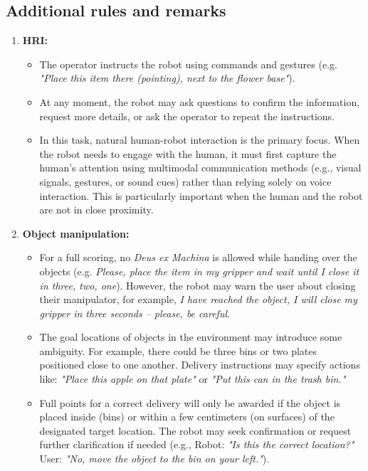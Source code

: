 \subsection*{Additional rules and remarks}
\begin{enumerate}[nosep]
	\item \textbf{HRI:}
	\begin{itemize}[nosep]
		\item The operator instructs the robot using commands and gestures (e.g. \textit{"Place this item there (pointing), next to the flower base"}).
		\item At any moment, the robot may ask questions to confirm the information, request more details, or ask the operator to repeat the instructions.
		\item In this task, natural human-robot interaction is the primary focus. When the robot needs to engage with the human, it must first capture the human’s attention using multimodal communication methods (e.g., visual signals, gestures, or sound cues) rather than relying solely on voice interaction. This is particularly important when the human and the robot are not in close proximity.
	\end{itemize}
	\item \textbf{Object manipulation:} 
        \begin{itemize}[nosep]
            \item For a full scoring, no \textit{Deus ex Machina} is allowed while handing over the objects (e.g. \textit{Please, place the item in my gripper and wait until I close it in three, two, one}). However, the robot may warn the user about closing their manipulator, for example, \textit{I have reached the object, I will close my gripper in three seconds -- please, be careful}.
            \item The goal locations of objects in the environment may introduce some ambiguity. For example, there could be three bins or two plates positioned close to one another. Delivery instructions may specify actions like: \textit{"Place this apple on that plate"} or \textit{"Put this can in the trash bin."}
            \item Full points for a correct delivery will only be awarded if the object is placed inside (bins) or within a few centimeters (on surfaces) of the designated target location. The robot may seek confirmation or request further clarification if needed (e.g., Robot: \textit{"Is this the correct location?"} User: \textit{"No, move the object to the bin on your left."}).
        \end{itemize}
\end{enumerate}

